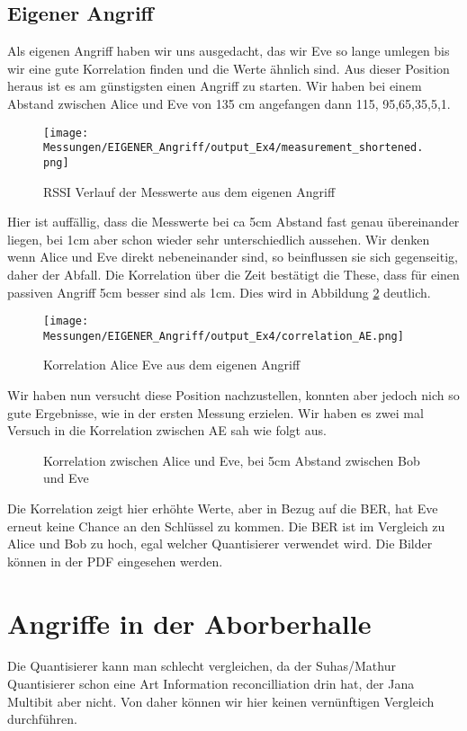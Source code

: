 \documentclass[12pt,a4paper]{article}
\begin{document}
\subsection*{Eigener Angriff}
Als eigenen Angriff haben wir uns ausgedacht, das wir Eve so lange umlegen bis wir eine gute Korrelation finden und die Werte ähnlich sind. Aus dieser Position heraus ist es am günstigsten einen Angriff zu starten. Wir haben bei einem Abstand zwischen Alice und Eve von 135 cm angefangen dann 115, 95,65,35,5,1. 
\begin{figure}[H]
\centering
\texttt{[image: Messungen/EIGENER\_Angriff/output\_Ex4/measurement\_shortened.png]}
\caption{RSSI Verlauf der Messwerte aus dem eigenen Angriff}
\label{fig:e1}
\end{figure}
Hier ist auffällig, dass die Messwerte bei ca 5cm Abstand fast genau übereinander liegen, bei 1cm aber schon wieder sehr unterschiedlich aussehen. Wir denken wenn Alice und Eve direkt nebeneinander sind, so beinflussen sie sich gegenseitig, daher der Abfall.
Die Korrelation über die Zeit bestätigt die These, dass für einen passiven Angriff 5cm besser sind als 1cm. Dies wird in Abbildung \ref{fig:e2} deutlich.
\begin{figure}[H]
\centering
\texttt{[image: Messungen/EIGENER\_Angriff/output\_Ex4/correlation\_AE.png]}
\caption{Korrelation Alice Eve aus dem eigenen Angriff}
\label{fig:e2}
\end{figure}
Wir haben nun versucht diese Position nachzustellen, konnten aber jedoch nich so gute Ergebnisse, wie in der ersten Messung erzielen. Wir haben es zwei mal Versuch in die Korrelation zwischen AE sah wie folgt aus.
\begin{figure}[H]
\centering
{} \qquad
{}
\caption{Korrelation zwischen Alice und Eve, bei 5cm Abstand zwischen Bob und Eve}
\label{fig:p4}
\end{figure}
Die Korrelation zeigt hier erhöhte Werte, aber in Bezug auf die BER, hat Eve erneut keine Chance an den Schlüssel zu kommen. Die BER ist im Vergleich zu Alice und Bob zu hoch, egal welcher Quantisierer verwendet wird. Die Bilder können in der PDF eingesehen werden.
\section{Angriffe in der Aborberhalle}
Die Quantisierer kann man schlecht vergleichen, da der Suhas/Mathur Quantisierer schon eine Art Information reconcilliation drin hat, der Jana Multibit aber nicht. Von daher können wir hier keinen vernünftigen Vergleich durchführen.
\end{document}
